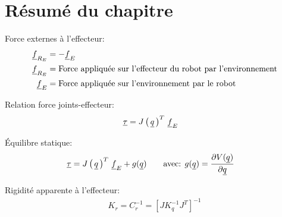 

\newpage
\section{Résumé du chapitre}

Force externes à l'effecteur:
\begin{align}
\underline{f}_{R_E} &= - \underline{f}_E \\
\underline{f}_{R_E} &= \text{Force appliquée sur l'effecteur du robot par l'environnement} \\
\underline{f}_E &= \text{Force appliquée sur l'environnement par le robot}
\end{align}

Relation force joints-effecteur:
\begin{align}
\underline{\tau} &= J\left( \, \underline{q} \, \right)^T \, \underline{f}_E 
\end{align}

Équilibre statique:
\begin{align}
\underline{\tau} &= J\left( \, \underline{q} \, \right)^T \, \underline{f}_E +  g( \underline{q} )
\quad \quad \text{avec:  }
g( \underline{q} ) = 
\frac{ \partial V(\underline{q} ) }{\partial \underline{q} } 
\end{align}

Rigidité apparente à l'effecteur:
\begin{align}
K_r = C_r^{-1} = \left[ J K_q^{-1} J^T \right]^{-1}
\end{align}
